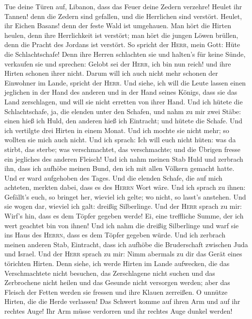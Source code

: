  Tue deine Türen auf, Libanon, dass das Feuer deine Zedern
verzehre!  Heulet ihr Tannen! denn die Zedern sind
gefallen, und die Herrlichen sind verstört. Heulet, ihr Eichen Basans!
denn der feste Wald ist umgehauen.  Man hört die Hirten
heulen, denn ihre Herrlichkeit ist verstört; man hört die jungen Löwen
brüllen, denn die Pracht des Jordans ist verstört.  So
spricht der \textsc{Herr}, mein Gott: Hüte die Schlachtschafe!
 Denn ihre Herren schlachten sie und halten's für keine
Sünde, verkaufen sie und sprechen: Gelobt sei der \textsc{Herr}, ich bin
nun reich! und ihre Hirten schonen ihrer nicht.  Darum
will ich auch nicht mehr schonen der Einwohner im Lande, spricht der
\textsc{Herr}. Und siehe, ich will die Leute lassen einen jeglichen in
der Hand des anderen und in der Hand seines Königs, dass sie das Land
zerschlagen, und will sie nicht erretten von ihrer Hand. 
Und ich hütete die Schlachtschafe, ja, die elenden unter den Schafen,
und nahm zu mir zwei Stäbe: einen hieß ich Huld, den anderen hieß ich
Eintracht; und hütete die Schafe.  Und ich vertilgte drei
Hirten in einem Monat. Und ich mochte sie nicht mehr; so wollten sie
mich auch nicht.  Und ich sprach: Ich will euch nicht
hüten: was da stirbt, das sterbe; was verschmachtet, das verschmachte;
und die Übrigen fresse ein jegliches des anderen Fleisch!
 Und ich nahm meinen Stab Huld und zerbrach ihn, dass ich
aufhöbe meinen Bund, den ich mit allen Völkern gemacht hatte.
 Und er ward aufgehoben des Tages. Und die elenden
Schafe, die auf mich achteten, merkten dabei, dass es des \textsc{Herrn}
Wort wäre.  Und ich sprach zu ihnen: Gefällt's euch, so
bringet her, wieviel ich gelte; wo nicht, so lasst's anstehen. Und sie
wogen dar, wieviel ich galt: dreißig Silberlinge.  Und
der \textsc{Herr} sprach zu mir: Wirf's hin, dass es dem Töpfer gegeben
werde! Ei, eine treffliche Summe, der ich wert geachtet bin von ihnen!
Und ich nahm die dreißig Silberlinge und warf sie ins Haus des
\textsc{Herrn}, dass es dem Töpfer gegeben würde.  Und
ich zerbrach meinen anderen Stab, Eintracht, dass ich aufhöbe die
Bruderschaft zwischen Juda und Israel.  Und der
\textsc{Herr} sprach zu mir: Nimm abermals zu dir das Gerät eines
törichten Hirten.  Denn siehe, ich werde Hirten im Lande
aufwecken, die das Verschmachtete nicht besuchen, das Zerschlagene nicht
suchen und das Zerbrochene nicht heilen und das Gesunde nicht versorgen
werden; aber das Fleisch der Fetten werden sie fressen und ihre Klauen
zerreißen.  O unnütze Hirten, die die Herde verlassen!
Das Schwert komme auf ihren Arm und auf ihr rechtes Auge! Ihr Arm müsse
verdorren und ihr rechtes Auge dunkel werden!


